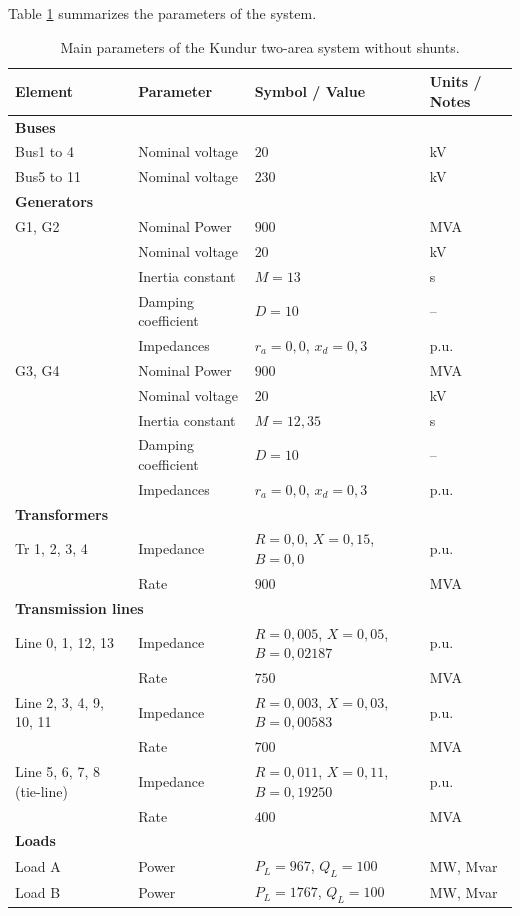 Table \ref{tab:properties_kundur} summarizes the parameters of the system.

\begin{table}[H]
\centering
\caption{Main parameters of the Kundur two-area system without shunts.}
\label{tab:properties_kundur}
\renewcommand{\arraystretch}{1.2}
\small
\begin{tabular}{|l|l|l|l|}
\hline
\textbf{Element} & \textbf{Parameter} & \textbf{Symbol / Value} & \textbf{Units / Notes} \\ 
\hline

\multicolumn{4}{|l|}{\textbf{Buses}} \\ 
\hline
Bus1 to 4 & Nominal voltage & $20$ & kV \\ 
Bus5 to 11 & Nominal voltage & $230$ & kV \\ 
\hline

\multicolumn{4}{|l|}{\textbf{Generators}} \\ 
\hline
G1, G2 & Nominal Power & $900$ & MVA \\ 
       & Nominal voltage & $20$ & kV \\ 
       & Inertia constant & $M = 13$ & s \\ 
       & Damping coefficient & $D = 10$ & -- \\ 
       & Impedances & $r_a = 0,0$, $x_d = 0,3$ & p.u. \\ 
G3, G4 & Nominal Power & $900$ & MVA \\ 
       & Nominal voltage & $20$ & kV \\ 
       & Inertia constant & $M = 12,35$ & s \\ 
       & Damping coefficient & $D = 10$ & -- \\ 
       & Impedances & $r_a = 0,0$, $x_d = 0,3$ & p.u. \\ 
\hline

\multicolumn{4}{|l|}{\textbf{Transformers}} \\ 
\hline
Tr 1, 2, 3, 4 & Impedance & $R = 0,0$, $X = 0,15$, $B = 0,0$ & p.u. \\ 
               & Rate & $900$ & MVA \\ 
\hline

\multicolumn{4}{|l|}{\textbf{Transmission lines}} \\ 
\hline
Line 0, 1, 12, 13 & Impedance & $R = 0,005$, $X = 0,05$, $B = 0,02187$ & p.u. \\ 
                   & Rate & $750$ & MVA \\ 
Line 2, 3, 4, 9, 10, 11 & Impedance & $R = 0,003$, $X = 0,03$, $B = 0,00583$ & p.u. \\ 
                         & Rate & $700$ & MVA \\ 
Line 5, 6, 7, 8 (tie-line) & Impedance & $R = 0,011$, $X = 0,11$, $B = 0,19250$ & p.u. \\ 
                            & Rate & $400$ & MVA \\ 
\hline
\multicolumn{4}{|l|}{\textbf{Loads}} \\ 
\hline
Load A & Power & $P_L = 967$, $Q_L = 100$ & MW, Mvar \\ 
Load B & Power & $P_L = 1767$, $Q_L = 100$ & MW, Mvar \\ 
\hline


\end{tabular}
\end{table}
